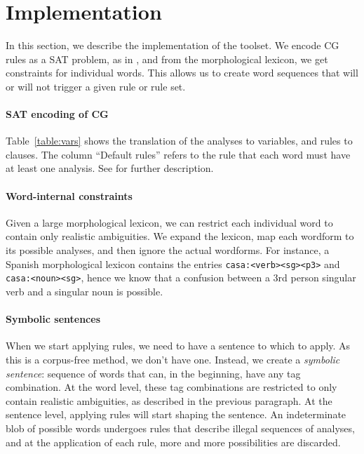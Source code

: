 \section{Implementation}
\label{sec:implementation}

In this section, we describe the implementation of the toolset.
We encode CG rules as a SAT problem, as in \cite{listenmaa_claessen2015}, and from the morphological lexicon, we get constraints for individual words. This allows us to create word sequences that will or will not trigger a given rule or rule set.

\paragraph{SAT encoding of CG}

Table~\ref{table:vars} shows the translation of the analyses to variables, and rules to clauses. The column ``Default rules'' refers to the rule that each word must have at least one analysis.
See \cite{listenmaa_claessen2015} for further description.



\paragraph{Word-internal constraints}

Given a large morphological lexicon, we can restrict each individual word to contain only realistic ambiguities. We expand the lexicon, map each wordform to its possible analyses, and then ignore the actual wordforms. For instance, a Spanish morphological lexicon contains the entries \texttt{casa:<verb><sg><p3>} and \texttt{casa:<noun><sg>}, hence we know that a confusion between a 3rd person singular verb and a singular noun is possible. 


\paragraph{Symbolic sentences}

When we start applying rules, we need to have a sentence to which to apply.
As this is a corpus-free method, we don't have one.
Instead, we create a \emph{symbolic sentence}: sequence of words that can, in the beginning, have any tag combination.
At the word level, these tag combinations are restricted to only contain realistic ambiguities, as described in the previous paragraph.
At the sentence level, applying rules will start shaping the sentence.
An indeterminate blob of possible words undergoes rules that describe illegal sequences of analyses,
and at the application of each rule, more and more possibilities are discarded.

